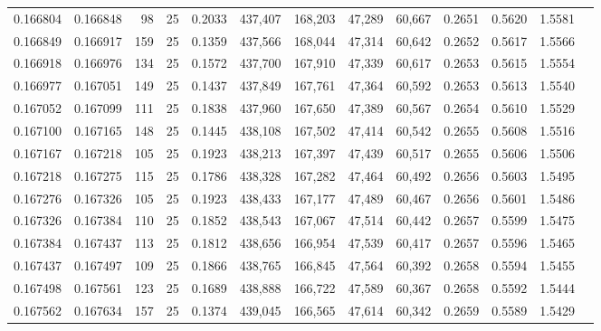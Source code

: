 \begin{tabular}{rrrrrrrrrrrrr}
0.166804 & 0.166848 &    98 &  25 &                                     0.2033 & 437,407 & 168,203 &  47,289 &  60,667 & 0.2651 & 0.5620 & 1.5581 \\
0.166849 & 0.166917 &   159 &  25 &                                     0.1359 & 437,566 & 168,044 &  47,314 &  60,642 & 0.2652 & 0.5617 & 1.5566 \\
0.166918 & 0.166976 &   134 &  25 &                                     0.1572 & 437,700 & 167,910 &  47,339 &  60,617 & 0.2653 & 0.5615 & 1.5554 \\
0.166977 & 0.167051 &   149 &  25 &                                     0.1437 & 437,849 & 167,761 &  47,364 &  60,592 & 0.2653 & 0.5613 & 1.5540 \\
0.167052 & 0.167099 &   111 &  25 &                                     0.1838 & 437,960 & 167,650 &  47,389 &  60,567 & 0.2654 & 0.5610 & 1.5529 \\
0.167100 & 0.167165 &   148 &  25 &                                     0.1445 & 438,108 & 167,502 &  47,414 &  60,542 & 0.2655 & 0.5608 & 1.5516 \\
0.167167 & 0.167218 &   105 &  25 &                                     0.1923 & 438,213 & 167,397 &  47,439 &  60,517 & 0.2655 & 0.5606 & 1.5506 \\
0.167218 & 0.167275 &   115 &  25 &                                     0.1786 & 438,328 & 167,282 &  47,464 &  60,492 & 0.2656 & 0.5603 & 1.5495 \\
0.167276 & 0.167326 &   105 &  25 &                                     0.1923 & 438,433 & 167,177 &  47,489 &  60,467 & 0.2656 & 0.5601 & 1.5486 \\
0.167326 & 0.167384 &   110 &  25 &                                     0.1852 & 438,543 & 167,067 &  47,514 &  60,442 & 0.2657 & 0.5599 & 1.5475 \\
0.167384 & 0.167437 &   113 &  25 &                                     0.1812 & 438,656 & 166,954 &  47,539 &  60,417 & 0.2657 & 0.5596 & 1.5465 \\
0.167437 & 0.167497 &   109 &  25 &                                     0.1866 & 438,765 & 166,845 &  47,564 &  60,392 & 0.2658 & 0.5594 & 1.5455 \\
0.167498 & 0.167561 &   123 &  25 &                                     0.1689 & 438,888 & 166,722 &  47,589 &  60,367 & 0.2658 & 0.5592 & 1.5444 \\
0.167562 & 0.167634 &   157 &  25 &                                     0.1374 & 439,045 & 166,565 &  47,614 &  60,342 & 0.2659 & 0.5589 & 1.5429 \\

\end{tabular}
